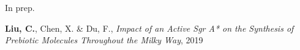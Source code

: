 


\begin{cventries}


\cventry
{In prep.} %
{} %
{} %
{} %
{ %
\begin{cvitems}
\item {\textbf{Liu, C.}, Chen, X. \& Du, F., \textit{Impact of an Active Sgr A* on the Synthesis of Prebiotic Molecules Throughout the Milky Way}, 2019}
\end{cvitems}
}


\end{cventries}